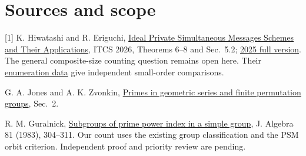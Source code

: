\documentclass[11pt]{article}
\begin{document}
\section*{Sources and scope}
[1] K. Hiwatashi and R. Eriguchi, \href{https://doi.org/10.4230/LIPIcs.ITCS.2026.76}{Ideal Private Simultaneous Messages Schemes and Their Applications}, ITCS 2026, Theorems 6--8 and Sec.~5.2; \href{https://eprint.iacr.org/2025/2217}{2025 full version}. The general composite-size counting question remains open here. Their \href{https://github.com/hiwatashi-keitaro/idealPSM/tree/f5a6dd2f7dda329a97e21e2790840277cf593ae6}{enumeration data} give independent small-order comparisons.\par
[2] G. A. Jones and A. K. Zvonkin, \href{https://arxiv.org/abs/2010.08023}{Primes in geometric series and finite permutation groups}, Sec.~2.\par
[3] R. M. Guralnick, \href{https://doi.org/10.1016/0021-8693(83)90190-4}{Subgroups of prime power index in a simple group}, J. Algebra 81 (1983), 304--311. Our count uses the existing group classification and the PSM orbit criterion. Independent proof and priority review are pending.
\end{document}
